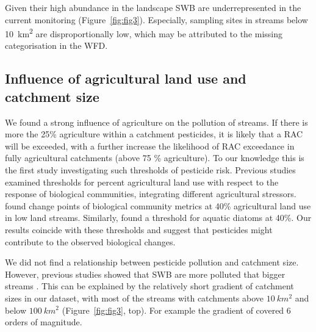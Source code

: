 \documentclass[journal=esthag,manuscript=article]{achemso}
\begin{document}
Given their high abundance in the landscape \citep{nadeau_hydrological_2007} SWB are underrepresented in the current monitoring (Figure~\ref{fig:fig3}). 
Especially, sampling sites in streams below 10~km\textsuperscript{2} are disproportionally low, which may be attributed to the missing categorisation in the WFD. 



\subsection{Influence of agricultural land use and catchment size}
We found a strong influence of agriculture on the pollution of streams.
If there is more the 25\% agriculture within a catchment pesticides, it is likely that a RAC will be exceeded, with a further increase the likelihood of RAC exceedance in fully agricultural catchments (above 75 \% agriculture).
To our knowledge this is the first study investigating such thresholds of pesticide risk.
Previous studies examined thresholds for percent agricultural land use with respect to the response of biological communities, integrating different agricultural stressors.
\citet{feld_response_2013} found change points of biological community metrics at 40\% agricultural land use  in low land streams.
Similarly, \citet{waite_agricultural_2014} found a threshold for aquatic diatoms at 40\%.
Our results coincide with these thresholds and suggest that pesticides might contribute to the observed biological changes. 

We did not find a relationship between pesticide pollution and catchment size.
However, previous studies showed that SWB are more polluted that bigger streams \citep{schulz_field_2004,stehle_pesticide_2015,knauer_pesticides_2016}.
This can be explained by the relatively short gradient of catchment sizes in our dataset, with most of the streams with catchments above $10~km^2$ and below $100~km^2$ (Figure~\ref{fig:fig3}, top).
For example the gradient of \citet{schulz_field_2004} covered 6 orders of magnitude.
\end{document}

